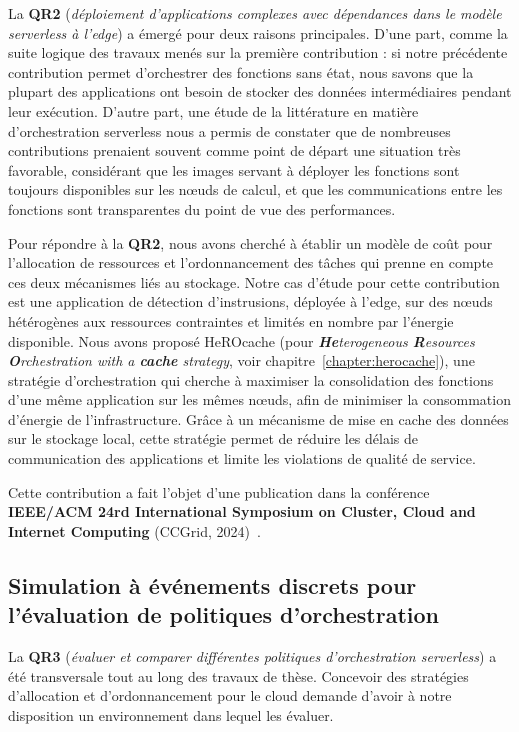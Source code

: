 La \textbf{QR2} (\textit{déploiement d'applications complexes avec dépendances dans le modèle serverless à l'edge}) a émergé pour deux raisons principales. D'une part, comme la suite logique des travaux menés sur la première contribution : si notre précédente contribution permet d'orchestrer des fonctions sans état, nous savons que la plupart des applications ont besoin de stocker des données intermédiaires pendant leur exécution. D'autre part, une étude de la littérature en matière d'orchestration serverless nous a permis de constater que de nombreuses contributions prenaient souvent comme point de départ une situation très favorable, considérant que les images servant à déployer les fonctions sont toujours disponibles sur les nœuds de calcul, et que les communications entre les fonctions sont transparentes du point de vue des performances.

Pour répondre à la \textbf{QR2}, nous avons cherché à établir un modèle de coût pour l'allocation de ressources et l'ordonnancement des tâches qui prenne en compte ces deux mécanismes liés au stockage. Notre cas d'étude pour cette contribution est une application de détection d'instrusions, déployée à l'edge, sur des nœuds hétérogènes aux ressources contraintes et limités en nombre par l'énergie disponible. Nous avons proposé HeROcache (pour \textit{\textbf{He}terogeneous \textbf{R}esources \textbf{O}rchestration with a \textbf{cache} strategy}, voir chapitre~\ref{chapter:herocache}), une stratégie d'orchestration qui cherche à maximiser la consolidation des fonctions d'une même application sur les mêmes nœuds, afin de minimiser la consommation d'énergie de l'infrastructure. Grâce à un mécanisme de mise en cache des données sur le stockage local, cette stratégie permet de réduire les délais de communication des applications et limite les violations de qualité de service.

Cette contribution a fait l'objet d'une publication dans la conférence \textbf{IEEE/ACM 24rd International Symposium on Cluster, Cloud and Internet Computing} (CCGrid, 2024)~\cite{herocache}.

\subsection{Simulation à événements discrets pour l'évaluation de politiques d'orchestration}

La \textbf{QR3} (\textit{évaluer et comparer différentes politiques d'orchestration serverless}) a été transversale tout au long des travaux de thèse. Concevoir des stratégies d'allocation et d'ordonnancement pour le cloud demande d'avoir à notre disposition un environnement dans lequel les évaluer.

